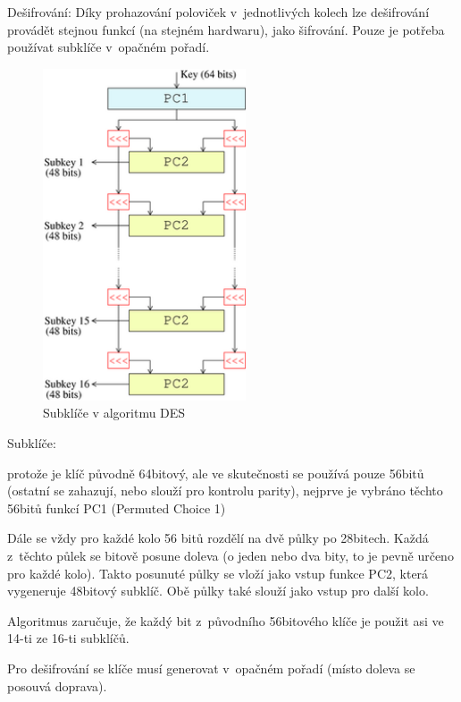 \begin{obecne}{Dešifrování:} 
Díky prohazování poloviček v jednotlivých kolech lze dešifrování provádět stejnou funkcí (na stejném hardwaru), jako šifrování. Pouze je potřeba používat subklíče v opačném pořadí.
\end{obecne}

\begin{figure}[ht]
  \begin{center}
    \includegraphics[width=6cm]{informatika/siete_a_bezpecnost/obrazky/des-key-schedule.png}
    \caption{Subklíče v algoritmu DES}
  \end{center}
\end{figure}

\begin{obecne}{Subklíče:}
\begin{pitemize}
	\item protože je klíč původně 64bitový, ale ve skutečnosti se používá pouze 56bitů (ostatní se zahazují, nebo slouží pro kontrolu parity), nejprve je vybráno těchto 56bitů funkcí PC1 (Permuted Choice 1) 
	\item Dále se vždy pro každé kolo 56 bitů rozdělí na dvě půlky po 28bitech. Každá z těchto půlek se bitově posune doleva (o jeden nebo dva bity, to je pevně určeno pro každé kolo). Takto posunuté půlky se vloží jako vstup funkce PC2, která vygeneruje 48bitový subklíč. Obě půlky také slouží jako vstup pro další kolo. 
	\item Algoritmus zaručuje, že každý bit z původního 56bitového klíče je použit asi ve 14-ti ze 16-ti subklíčů. 
	\item Pro dešifrování se klíče musí generovat v opačném pořadí (místo doleva se posouvá doprava).
\end{pitemize}
\end{obecne}
